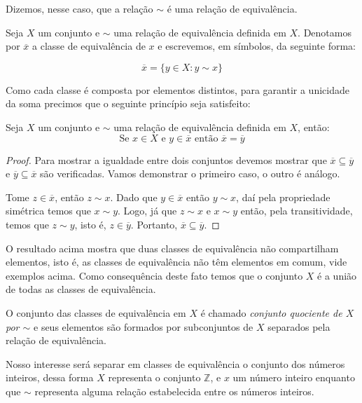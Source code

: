 	
	Dizemos, nesse caso, que a rela\c{c}\~ao $\sim$ \'e uma rela\c{c}\~{a}o de equival\^encia. 
		
	Seja $X$ um conjunto e $\sim$ uma rela\c{c}\~{a}o de equival\^{e}ncia definida em $X$. Denotamos por $\overline{x}$ 
	a classe de equival\^{e}ncia de $x$ e escrevemos, em s\'{i}mbolos, da seguinte forma:
	
	                     $$\overline{x}=\{y\in X: y\sim x\}$$
	
	Como cada classe \'{e} composta por elementos distintos, para garantir a unicidade da soma precimos que o 
	seguinte princ\'{i}pio seja satisfeito:
	
	\begin{Th}
		Seja $X$ um conjunto e $\sim$ uma rela\c{c}\~{a}o de equival\^{e}ncia definida em $X$, ent\~{a}o:
		$$\textrm{Se } x\in X \textrm{ e } y\in\overline{x} \textrm{ ent\~{a}o } \overline{x}=\overline{y}$$
	\end{Th}
	
	\begin{proof}
		Para mostrar a igualdade entre dois conjuntos devemos mostrar que $\overline{x}\subseteq\overline{y}$
		e $\overline{y}\subseteq\overline{x}$ s\~ao verificadas. Vamos demonstrar o primeiro caso, o outro \'{e} an\'{a}logo.
			
		Tome $z\in\overline{x}$, ent\~{a}o $z\sim x$. Dado que $y\in\overline{x}$
			ent\~{a}o $y\sim x$, da\'{i} pela propriedade sim\'{e}trica temos que $x\sim y$. Logo, j\'{a} que 
			$z\sim x$ e $x\sim y$ ent\~{a}o, pela transitividade, temos que $z\sim y$, isto \'{e}, $z\in\overline{y}$.
			Portanto, $\overline{x}\subseteq\overline{y}$. 
	\end{proof}
	
	O resultado acima mostra que duas classes de equival\^{e}ncia n\~{a}o compartilham elementos, isto \'{e}, as classes de equival\^{e}ncia
	n\~{a}o t\^{e}m elementos em comum, vide exemplos acima. Como consequ\^{e}ncia deste fato temos que o conjunto $X$ \'{e} a 
	uni\~{a}o de todas as classes de equival\^{e}ncia. 
	
	O conjunto das classes de equival\^{e}ncia em $X$ \'{e} chamado \textit{conjunto quociente de $X$ por $\sim$} e 
	seus elementos s\~{a}o formados por subconjuntos de $X$ separados pela rela\c{c}\~{a}o de equival\^{e}ncia.
	
	Nosso interesse ser\'{a} separar em classes de equival\^{e}ncia o conjunto dos n\'{u}meros inteiros, dessa forma $X$ representa
	o conjunto $\mathbb{Z}$, e $x$ um n\'{u}mero inteiro enquanto que
	$\sim$ representa alguma rela\c{c}\~{a}o estabelecida entre os n\'{u}meros inteiros. 
	
